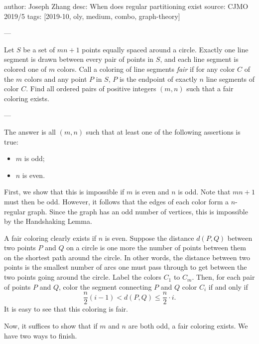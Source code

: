 author: Joseph Zhang
desc: When does regular partitioning exist
source: CJMO 2019/5
tags: [2019-10, oly, medium, combo, graph-theory]

---

Let $S$ be a set of $mn+1$ points equally spaced around a circle. Exactly one line segment is drawn between every pair of points in $S$, and each line segment is colored one of $m$ colors. Call a coloring of line segments \emph{fair} if for any color $C$ of the $m$ colors and any point $P$ in $S$, $P$ is the endpoint of exactly $n$ line segments of color $C.$ Find all ordered pairs of positive integers $(m,n)$ such that a fair coloring exists.

---

The answer is all $(m,n)$ such that at least one of the following assertions is true:
\begin{itemize}[itemsep=0em]
    \item $m$ is odd;
    \item $n$ is even.
\end{itemize}

First, we show that this is impossible if $m$ is even and $n$ is odd. Note that $mn+1$ must then be odd. However, it follows that the edges of each color form a $n$-regular graph. Since the graph has an odd number of vertices, this is impossible by the Handshaking Lemma.

A fair coloring clearly exists if $n$ is even. Suppose the distance $d(P,Q)$ between two points $P$ and $Q$ on a circle is one more the number of points between them on the shortest path around the circle. In other words, the distance between two points is the smallest number of arcs one must pass through to get between the two points going around the circle. Label the colors $C_1$ to $C_m$. Then, for each pair of points $P$ and $Q$, color the segment connecting $P$ and $Q$ color $C_i$ if and only if \[\frac{n}{2}(i-1)<d(P,Q)\le\frac{n}{2}\cdot i.\]
It is easy to see that this coloring is fair.

Now, it suffices to show that if $m$ and $n$ are both odd, a fair coloring exists. We have two ways to finish.

